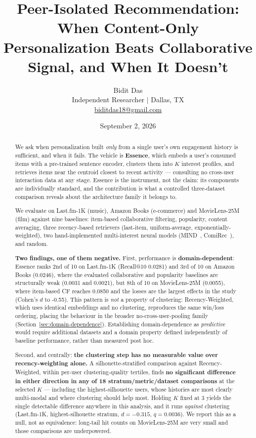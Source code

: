 \documentclass[11pt,a4paper]{article}
\title{
    \Large\textbf{Peer-Isolated Recommendation: When Content-Only}\\[4pt]
    \Large\textbf{Personalization Beats Collaborative Signal, and When It Doesn't}
}
\author{
    Bidit Das\\
    \small Independent Researcher $\mid$ Dallas, TX\\
    \small \href{mailto:biditdas18@gmail.com}{biditdas18@gmail.com}
}
\date{September 2, 2026}
\begin{document}
\maketitle

\begin{abstract}
We ask when personalization built \emph{only} from a single user's own
engagement history is sufficient, and when it fails. The vehicle is
\textbf{Essence}, which embeds a user's consumed items with a pre-trained
sentence encoder, clusters them into $K$ interest profiles, and retrieves
items near the centroid closest to recent activity --- consulting no
cross-user interaction data at any stage. Essence is the instrument, not the
claim: its components are individually standard, and the contribution is what
a controlled three-dataset comparison reveals about the architecture family it
belongs to.

We evaluate on Last.fm-1K (music), Amazon Books (e-commerce) and
MovieLens-25M (film) against nine baselines: item-based collaborative
filtering, popularity, content averaging, three recency-based retrievers
(last-item, uniform-average, exponentially-weighted), two hand-implemented
multi-interest neural models (MIND~\cite{li2019}, ComiRec~\cite{cen2020}), and
random.

\textbf{Two findings, one of them negative.} First, performance is
\textbf{domain-dependent}: Essence ranks 2nd of 10 on Last.fm-1K
(Recall@10 0.0281) and 3rd of 10 on Amazon Books (0.0246), where the
evaluated collaborative and popularity baselines are structurally weak
(0.0031 and 0.0021), but 8th of 10 on MovieLens-25M (0.0055),
where item-based CF reaches 0.0850 and the losses are the largest effects
in the study (Cohen's $d$ to -0.55). This pattern is \emph{not} a
property of clustering: Recency-Weighted, which uses identical embeddings and
no clustering, reproduces the same win/loss ordering, placing the behaviour in
the broader no-cross-user-pooling family
(Section~\ref{sec:domain-dependence}). Establishing domain-dependence as
\emph{predictive} would require additional datasets and a domain property
defined independently of baseline performance, rather than measured post hoc.

Second, and centrally: \textbf{the clustering step has no measurable value
over recency-weighting alone.} A silhouette-stratified comparison against
Recency-Weighted, within per-user clustering-quality tertiles, finds
\textbf{no significant difference in either direction in any of 18
stratum/metric/dataset comparisons} at the selected $K$ --- including the
highest-silhouette users, whose histories are most clearly multi-modal and
where clustering should help most. Holding $K$ fixed at 3 yields the single
detectable difference anywhere in this analysis, and it runs \emph{against}
clustering (Last.fm-1K, highest-silhouette stratum, $d=-0.315$,
$q=0.0036$). We report this as a null, not as equivalence: long-tail hit
counts on MovieLens-25M are very small and those comparisons are underpowered.


\end{abstract}
\end{document}

